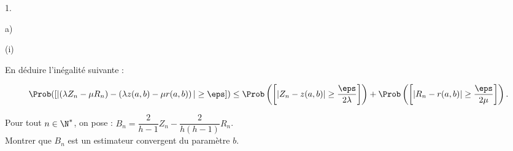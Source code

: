 \begin{noliste}{1.}
\begin{noliste}{a)}
\begin{noliste}{(i)}
    
	
	
	
	
      
    \item En déduire l'inégalité suivante :
    \end{noliste}
    \[
    \Prob([\vert(\lambda Z_n-\mu R_n)-\left(\lambda z(a,b) -\mu
      r(a,b)\right)\vert \geq \eps ]) \leq \Prob\left(\left[ \vert
        Z_n-z(a,b)\vert \geq \dfrac{\eps}{2\lambda}\right]\right) +
    \Prob\left(\left[\vert R_n-r(a,b)\vert \geq
        \dfrac{\eps}{2\mu}\right]\right).
    \]
    
    
    
  \item Pour tout $n\in\N^*$, on pose : $B_n=\dfrac{2}{h-1}Z_n -
    \dfrac{2}{h(h-1)}R_n$.\\
    Montrer que $B_n$ est un estimateur convergent du paramètre $b$.
    
    
  \end{noliste}
\end{noliste}

% 


